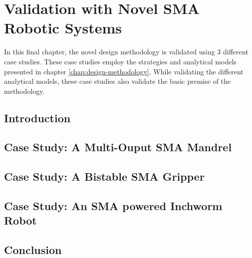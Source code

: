 
\chapter{Validation with Novel SMA Robotic Systems}
In this final chapter, the novel design methodology is validated using 3 different case studies. These case studies employ the strategies and analytical models presented in chapter \ref{chap:design-methodology}. While validating the different analytical models, these case studies also validate the basic premise of the methodology.
\section{Introduction}
\section{Case Study: A Multi-Ouput SMA Mandrel}
\section{Case Study: A Bistable SMA Gripper}
\section{Case Study: An SMA powered Inchworm Robot}
\section{Conclusion}
